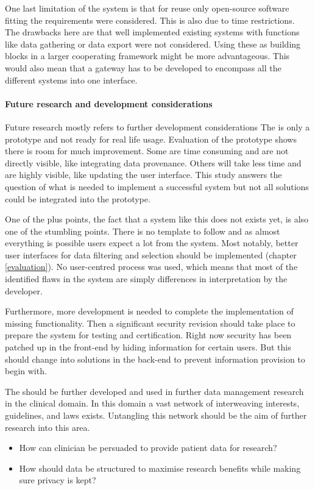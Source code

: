 One last limitation of the system is that for reuse only open-source software fitting the requirements were considered.
This is also due to time restrictions.
The drawbacks here are that well implemented existing systems with functions like data gathering or data export were not considered.
Using these as building blocks in a larger cooperating framework might be more advantageous.
This would also mean that a gateway has to be developed to encompass all the different systems into one interface.

\paragraph{Future research and development considerations}
Future research mostly refers to further development considerations
The \ivfsystem{} is only a prototype and not ready for real life usage.
Evaluation of the prototype shows there is room for much improvement.
Some are time consuming and are not directly visible, like integrating data provenance.
Others will take less time and are highly visible, like updating the user interface.
This study answers the question of what is needed to implement a successful system but not all solutions could be integrated into the prototype.

One of the plus points, the fact that a system like this does not exists yet, is also one of the stumbling points.
There is no template to follow and as almost everything is possible users expect a lot from the system.
Most notably, better user interfaces for data filtering and selection should be implemented (chapter \ref{evaluation}).
No user-centred process was used, which means that most of the identified flaws in the system are simply differences in interpretation by the developer.

Furthermore, more development is needed to complete the implementation of missing functionality.
Then a significant security revision should take place to prepare the system for testing and certification.
Right now security has been patched up in the front-end by hiding information for certain users. 
But this should change into solutions in the back-end to prevent information provision to begin with.

The \ivfsystem{} should be further developed and used in further data management research in the clinical domain.
In this domain a vast network of interweaving interests, guidelines, and laws exists.
Untangling this network should be the aim of further research into this area.
\begin{itemize}
	\item How can clinician be persuaded to provide patient data for research?
	\item How should data be structured to maximise research benefits while making sure privacy is kept?
\end{itemize}

